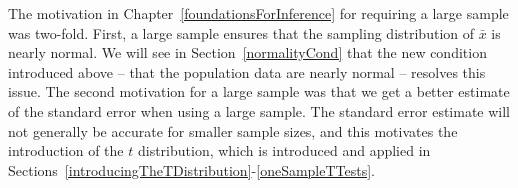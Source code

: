 %
%

The motivation in Chapter~\ref{foundationsForInference} for requiring a large sample was two-fold. First, a large sample ensures that the sampling distribution of $\bar{x}$ is nearly normal. We will see in Section~\ref{normalityCond} that the new condition introduced above -- that the population data are nearly normal -- resolves this issue. The second motivation for a large sample was that we get a better estimate of the standard error when using a large sample. %
The standard error estimate will not generally be accurate for smaller sample sizes, and this motivates the introduction of the $t$ distribution, which is introduced and applied in Sections~\ref{introducingTheTDistribution}-\ref{oneSampleTTests}.



